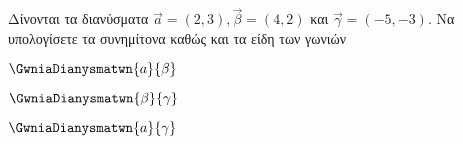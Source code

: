 Δίνονται τα διανύσματα $ \vec{a}=(2,3),\vec{\beta}=(4,2) $ και $ \vec{\gamma}=(-5,-3) $. Να υπολογίσετε τα συνημίτονα καθώς και τα είδη των γωνιών
\begin{multicols}{3}
\begin{alist}
\item $ \GwniaDianysmatwn{a}{\beta} $
\item $ \GwniaDianysmatwn{\beta}{\gamma} $
\item $ \GwniaDianysmatwn{a}{\gamma} $
\end{alist}
\end{multicols}

